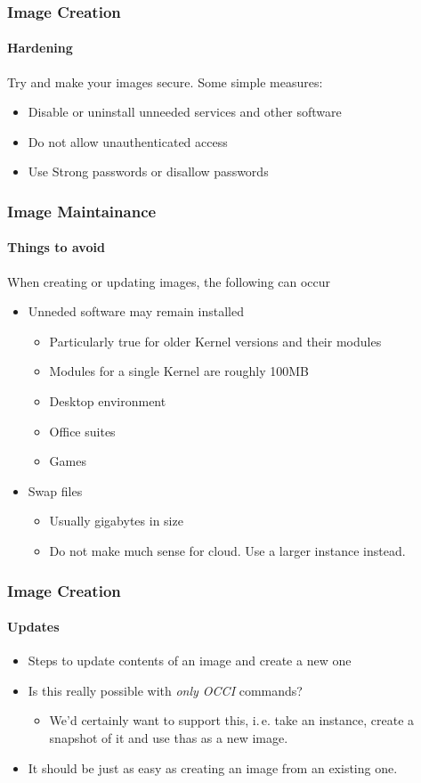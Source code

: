 \begin{frame}
\frametitle{Image Creation}
\framesubtitle{Hardening}
Try and make your images secure. Some simple measures:
\begin{itemize}
\item Disable or uninstall unneeded services and other software
\item Do not allow unauthenticated access
\item Use Strong passwords or disallow passwords
\end{itemize}
\end{frame}


\begin{frame}
\frametitle{Image Maintainance}
\framesubtitle{Things to avoid}
When creating or updating images, the following can occur
\begin{itemize}
\item Unneded software may remain installed
  \begin{itemize}
  \item Particularly true for older Kernel versions and their modules
  \item Modules for a single Kernel are roughly 100MB
  \item Desktop environment
  \item Office suites
  \item Games
  \end{itemize}
\item Swap files
  \begin{itemize}
  \item Usually gigabytes in size
  \item Do not make much sense for cloud. Use a larger instance instead.
  \end{itemize}
\end{itemize}
\end{frame}

\begin{frame}
\frametitle{Image Creation}
\framesubtitle{Updates}
\begin{itemize}
\item Steps to update contents of an image and create a new one
\item Is this really possible with \emph{only OCCI} commands?
  \begin{itemize}
  \item We'd certainly want to support this, i.\,e. take an instance,
    create a snapshot of it and use thas as a new image.
  \end{itemize}
\item It should be just as easy as creating an image from an existing one.
\end{itemize}
\end{frame}

